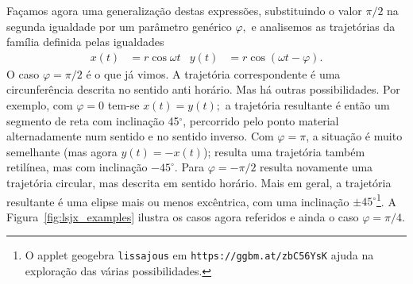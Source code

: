 Façamos agora uma generalização destas expressões, substituindo o valor $\pi/2$
na segunda igualdade por um parâmetro genérico $\varphi,$ e analisemos as
trajetórias da família definida pelas igualdades
\begin{align}\label{eq:mcu2}
x(t)&=r\cos\omega t& y(t)&=r\cos(\omega t-\varphi).
\end{align}
O caso $\varphi=\pi/2$ é o que já vimos. A trajetória correspondente é uma
circunferência descrita no sentido anti horário. Mas há outras possibilidades.
Por exemplo, com $\varphi=0$ tem-se $x(t)=y(t);$ a trajetória resultante é então
um segmento de reta com inclinação 45$^\circ$, percorrido pelo ponto material
alternadamente num sentido e no sentido inverso.  Com $\varphi=\pi$, a situação
é muito semelhante (mas agora $y(t)=-x(t)$); resulta uma trajetória também
retilínea, mas com inclinação $-45^\circ$. Para $\varphi=-\pi/2$ resulta
novamente uma trajetória circular, mas descrita em sentido horário. Mais em
geral, a trajetória resultante é uma elipse mais ou menos excêntrica, com uma
inclinação $\pm45^\circ$\footnote{O applet geogebra \texttt{lissajous} em
\texttt{https://ggbm.at/zbC56YsK} ajuda na exploração
das várias possibilidades.}.  A Figura~\ref{fig:lsjx_examples} ilustra os casos
agora referidos e ainda o caso $\varphi=\pi/4$.
